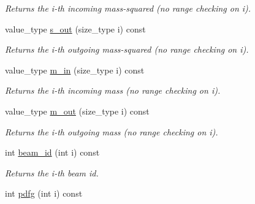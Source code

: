 \begin{DoxyCompactItemize}
\begin{DoxyCompactList}\small\item\em Returns the i-\/th incoming mass-\/squared (no range checking on i). \end{DoxyCompactList}\item 
\hypertarget{a00430_a2ed990d63db381ee1b2bedbe00dd56bf}{value\-\_\-type \hyperlink{a00430_a2ed990d63db381ee1b2bedbe00dd56bf}{s\-\_\-out} (size\-\_\-type i) const }\label{a00430_a2ed990d63db381ee1b2bedbe00dd56bf}

\begin{DoxyCompactList}\small\item\em Returns the i-\/th outgoing mass-\/squared (no range checking on i). \end{DoxyCompactList}\item 
\hypertarget{a00430_a0d7e11bb6847f807fa13aa38d27baf34}{value\-\_\-type \hyperlink{a00430_a0d7e11bb6847f807fa13aa38d27baf34}{m\-\_\-in} (size\-\_\-type i) const }\label{a00430_a0d7e11bb6847f807fa13aa38d27baf34}

\begin{DoxyCompactList}\small\item\em Returns the i-\/th incoming mass (no range checking on i). \end{DoxyCompactList}\item 
\hypertarget{a00430_a0764bde067cdc21b0aa2ca0d8318c008}{value\-\_\-type \hyperlink{a00430_a0764bde067cdc21b0aa2ca0d8318c008}{m\-\_\-out} (size\-\_\-type i) const }\label{a00430_a0764bde067cdc21b0aa2ca0d8318c008}

\begin{DoxyCompactList}\small\item\em Returns the i-\/th outgoing mass (no range checking on i). \end{DoxyCompactList}\item 
\hypertarget{a00430_a6841f702b3f6461196ac7bf89c047ab8}{int \hyperlink{a00430_a6841f702b3f6461196ac7bf89c047ab8}{beam\-\_\-id} (int i) const }\label{a00430_a6841f702b3f6461196ac7bf89c047ab8}

\begin{DoxyCompactList}\small\item\em Returns the i-\/th beam id. \end{DoxyCompactList}\item 
\hypertarget{a00430_a23df6b1572d4be25d5ee1dc86d0700ac}{int \hyperlink{a00430_a23df6b1572d4be25d5ee1dc86d0700ac}{pdfg} (int i) const }\label{a00430_a23df6b1572d4be25d5ee1dc86d0700ac}


\end{DoxyCompactItemize}
